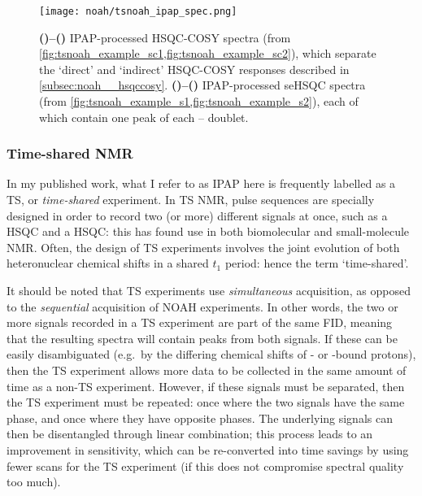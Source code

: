 \begin{figure}[!ht]
    \centering
    \texttt{[image: noah/tsnoah\_ipap\_spec.png]}%
    {\label{fig:tsnoah_ipap_spec_sc_direct}}%
    {\label{fig:tsnoah_ipap_spec_sc_indirect}}%
    {\label{fig:tsnoah_ipap_spec_s_alpha}}%
    {\label{fig:tsnoah_ipap_spec_s_beta}}%
    \caption[IPAP processed spectra from NOAH-8 supersequence]{
        \textbf{()--()} IPAP-processed HSQC-COSY spectra (from \cref{fig:tsnoah_example_sc1,fig:tsnoah_example_sc2}), which separate the `direct' and `indirect' HSQC-COSY responses described in \cref{subsec:noah__hsqccosy}.
        \textbf{()--()} IPAP-processed seHSQC spectra (from \cref{fig:tsnoah_example_s1,fig:tsnoah_example_s2}), each of which contain one peak of each \proton{}--\carbon{} doublet.
    }
    \label{fig:tsnoah_ipap_spec}
\end{figure}

\subsubsection{Time-shared NMR}

In my published work\autocite{Kupce2021JACSA}, what I refer to as IPAP here is frequently labelled as a TS, or \textit{time-shared} experiment.
In TS NMR, pulse sequences are specially designed in order to record two (or more) different signals at once, such as a \carbon{} HSQC and a \nitrogen{} HSQC: this has found use in both biomolecular\autocite{Farmer1991JMR,Boelens1994JBNMR,Pascal1994JMRSB,Sattler1995JBNMR,Frueh2009JBNMR,Lohr2014JMR} and small-molecule NMR\autocite{Nolis2006MRC,PerezTrujillo2007OL,Nolis2007ACIE,Parella2010CMR}.
Often, the design of TS experiments involves the joint evolution of both heteronuclear chemical shifts in a shared $t_1$ period: hence the term `time-shared'.

It should be noted that TS experiments use \textit{simultaneous} acquisition, as opposed to the \textit{sequential} acquisition of NOAH experiments.
In other words, the two or more signals recorded in a TS experiment are part of the same FID, meaning that the resulting spectra will contain peaks from both signals.
If these can be easily disambiguated (e.g.\ by the differing chemical shifts of \carbon{}- or \nitrogen{}-bound protons), then the TS experiment allows more data to be collected in the same amount of time as a non-TS experiment.
However, if these signals must be separated, then the TS experiment must be repeated: once where the two signals have the same phase, and once where they have opposite phases.
The underlying signals can then be disentangled through linear combination\autocite{Sorensen1990JMR,Farmer1991JMR}; this process leads to an improvement in sensitivity, which can be re-converted into time savings by using fewer scans for the TS experiment (if this does not compromise spectral quality too much).

